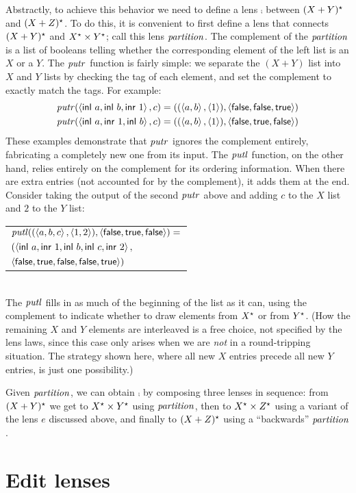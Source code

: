 Abstractly, to achieve this behavior we need to define a lens $\comp$
between $(X+Y)^\star$ and 
$(X+Z)^\star$.  To do this, it is convenient to first define a lens that
connects $(X+Y)^\star$ and $X^\star \times Y^\star$; call this lens $\mathit{partition}$.
The complement of the $\mathit{partition}$ is a list of booleans telling whether the
corresponding element of the left list is an $X$ or a $Y$. The $\mathit{putr}$
function is fairly simple: we separate the $(X+Y)$ list into $X$ and $Y$
lists by checking the tag of each element, and set the complement to exactly
match the tags. For example:
\begin{align*}
\mathit{putr}(\left<\mathsf{inl}\  a,\mathsf{inl}\  b,\mathsf{inr}\  1\right>,c) &=
    ((\left<a,b\right>,\left<1\right>),\left<\mathsf{false},\mathsf{false},\mathsf{true}\right>) \\
\mathit{putr}(\left<\mathsf{inl}\  a,\mathsf{inr}\  1,\mathsf{inl}\  b\right>,c) &=
    ((\left<a,b\right>,\left<1\right>),\left<\mathsf{false},\mathsf{true},\mathsf{false}\right>)
\end{align*}
These examples demonstrate that $\mathit{putr}$ ignores the complement entirely,
fabricating a completely new one from its input. The $\mathit{putl}$ function, on
the other hand, relies entirely on the complement for its ordering
information. When there are extra entries (not accounted for by the
complement), it adds them at the 
end. Consider taking the output of the second $\mathit{putr}$ above and
adding $c$ to the $X$ list and $2$ to the $Y$ list:
\\[1.5ex]
\noindent\begin{tabular}{l}
$\mathit{putl}((\left<a,b,c\right>,\left<1,2\right>),\left<\mathsf{false},\mathsf{true},\mathsf{false}\right>) =$ \\
\qquad$(\left<\mathsf{inl}\  a,\mathsf{inr}\  1,\mathsf{inl}\  b,\mathsf{inl}\  c,\mathsf{inr}\  2\right>,$ \\
\qquad$\left<\mathsf{false},\mathsf{true},\mathsf{false},\mathsf{false},\mathsf{true}\right>)$
\end{tabular}
\\[1.5ex]
\noindent The $\mathit{putl}$ fills in as much of the beginning of the list as it
can, using the complement to indicate whether to draw elements from $X^\star$
or from $Y^\star$.  (How the remaining $X$ and $Y$ elements are interleaved
is a free choice, not specified by the lens laws, since this case only
arises when we are {\em not} in a round-tripping situation. The strategy
shown here, where all new $X$ entries precede all new $Y$ entries, is just
one possibility.)

Given $\mathit{partition}$, we can obtain $\comp$ by composing three lenses in
sequence: from $(X+Y)^\star$ we get to $X^\star \times Y^\star$ using
$\mathit{partition}$, then to $X^\star \times Z^\star$ using a variant of the lens $e$ 
discussed above, and finally to $(X+Z)^\star$ using a ``backwards''
$\mathit{partition}$. 

\iffull

\section{Edit lenses}
